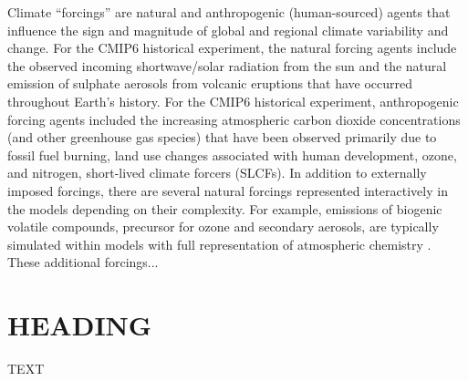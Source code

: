 \documentclass[gmd, preprint]{copernicus}
\newcommand{\mycomment}[1]{}
\begin{document}


\mycomment{Details about CMIP5 forcings can be found in https://pcmdi.llnl.gov/mips/cmip5/docs/Experiment_design_addendum.pdf}


\introduction  %
Climate “forcings” are natural and anthropogenic (human-sourced) agents that influence the sign and magnitude of global and regional climate variability and change. For the CMIP6 historical experiment, the natural forcing agents include the observed incoming shortwave/solar radiation from the sun and the natural emission of sulphate aerosols from volcanic eruptions that have occurred throughout Earth’s history. For the CMIP6 historical experiment, anthropogenic forcing agents included the increasing atmospheric carbon dioxide concentrations (and other greenhouse gas species) that have been observed primarily due to fossil fuel burning, land use changes associated with human development, ozone, and nitrogen, short-lived climate forcers (SLCFs). In addition to externally imposed forcings, there are several natural forcings represented interactively in the models depending on their complexity. For example, emissions of biogenic volatile compounds, precursor for ozone and secondary aerosols, are typically simulated within models with full representation of atmospheric chemistry \citep{thornhill_climate-driven_2021,young_pre-industrial_2013}. These additional forcings...


\section{HEADING}
TEXT
\end{document}
